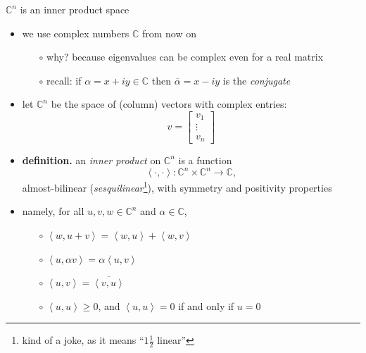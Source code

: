 \documentclass[10pt,hyperref]{beamer}
\newcommand{\CC}{\mathbb{C}}
\newcommand{\ip}[2]{\left<#1,#2\right>}
\begin{document}
\begin{frame}{$\CC^n$ is an inner product space}

\begin{itemize}
\item we use complex numbers $\CC$ from now on
    \begin{itemize}
    \item[$\circ$] why? because eigenvalues can be complex even for a real matrix
    \item[$\circ$] recall: if $\alpha=x+iy \in \CC$ then $\overline{\alpha} = x-iy$ is the \emph{conjugate}
    \end{itemize}
\item let $\CC^n$ be the space of (column) vectors with complex entries:
\footnotesize
    $$v = \begin{bmatrix}
    v_1 \\ \vdots \\ v_n
    \end{bmatrix}$$
\normalsize
\vspace{-2mm}
\item \textbf{definition.} an \emph{inner product} on $\CC^n$ is a function
    $$\ip{\cdot}{\cdot}:\CC^n\times \CC^n \to \CC,$$
almost-bilinear (\emph{sesquilinear}\footnote{\tiny kind of a joke, as it means ``$1\frac{1}{2}$ linear''}), with symmetry and positivity properties
\item namely, for all $u,v,w \in \CC^n$ and $\alpha\in \CC$,
    \begin{itemize}
    \item[$\circ$] $\ip{w}{u+v} = \ip{w}{u} + \ip{w}{v}$
    \item[$\circ$] $\ip{u}{\alpha v} = \alpha \ip{u}{v}$
    \item[$\circ$] $\ip{u}{v} = \overline{\ip{v}{u}}$
    \item[$\circ$] $\ip{u}{u} \ge 0$, and $\ip{u}{u}=0$ if and only if $u=0$
    \end{itemize}
\end{itemize}
\end{frame}
\end{document}
